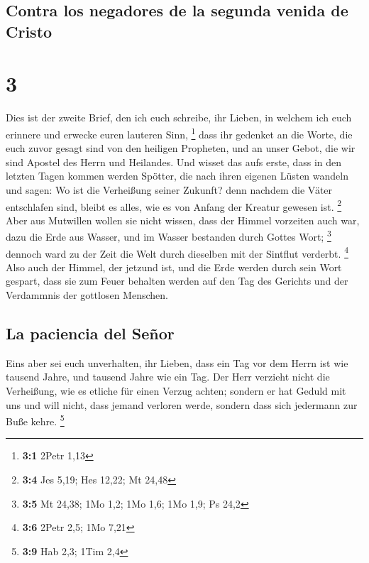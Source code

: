 \hypertarget{contra-los-negadores-de-la-segunda-venida-de-cristo}{%
\subsection{Contra los negadores de la segunda venida de
Cristo}\label{contra-los-negadores-de-la-segunda-venida-de-cristo}}

\hypertarget{section-2}{%
\section{3}\label{section-2}}

 Dies ist der zweite Brief, den ich euch schreibe, ihr
Lieben, in welchem ich euch erinnere und erwecke euren lauteren Sinn,
\footnote{\textbf{3:1} 2Petr 1,13}  dass ihr gedenket an
die Worte, die euch zuvor gesagt sind von den heiligen Propheten, und an
unser Gebot, die wir sind Apostel des Herrn und Heilandes.
 Und wisset das aufs erste, dass in den letzten Tagen
kommen werden Spötter, die nach ihren eigenen Lüsten wandeln
 und sagen: Wo ist die Verheißung seiner Zukunft? denn
nachdem die Väter entschlafen sind, bleibt es alles, wie es von Anfang
der Kreatur gewesen ist. \footnote{\textbf{3:4} Jes 5,19; Hes 12,22; Mt
  24,48}  Aber aus Mutwillen wollen sie nicht wissen, dass
der Himmel vorzeiten auch war, dazu die Erde aus Wasser, und im Wasser
bestanden durch Gottes Wort; \footnote{\textbf{3:5} Mt 24,38; 1Mo 1,2;
  1Mo 1,6; 1Mo 1,9; Ps 24,2}  dennoch ward zu der Zeit die
Welt durch dieselben mit der Sintflut verderbt. \footnote{\textbf{3:6}
  2Petr 2,5; 1Mo 7,21}  Also auch der Himmel, der jetzund
ist, und die Erde werden durch sein Wort gespart, dass sie zum Feuer
behalten werden auf den Tag des Gerichts und der Verdammnis der
gottlosen Menschen.

\hypertarget{la-paciencia-del-seuxf1or}{%
\subsection{La paciencia del Señor}\label{la-paciencia-del-seuxf1or}}

 Eins aber sei euch unverhalten, ihr Lieben, dass ein Tag
vor dem Herrn ist wie tausend Jahre, und tausend Jahre wie ein Tag.
 Der Herr verzieht nicht die Verheißung, wie es etliche
für einen Verzug achten; sondern er hat Geduld mit uns und will nicht,
dass jemand verloren werde, sondern dass sich jedermann zur Buße kehre.
\footnote{\textbf{3:9} Hab 2,3; 1Tim 2,4}


